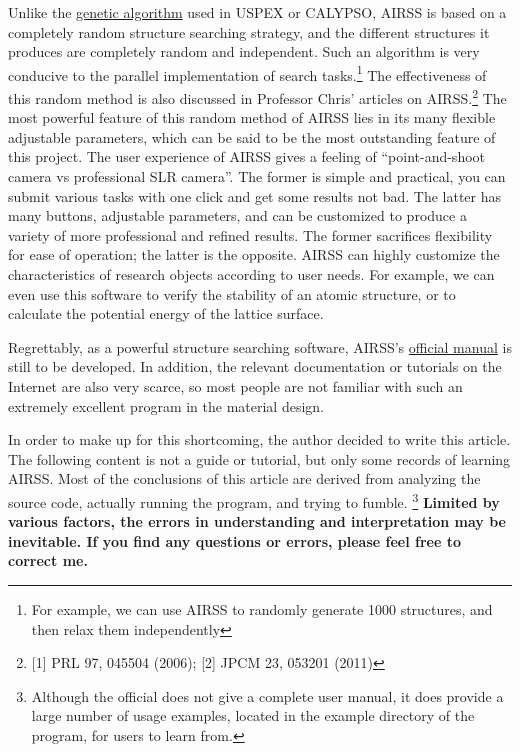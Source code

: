 \documentclass[a4paper, 10pt]{article}
\begin{document}
Unlike the \href{https://en.wikipedia.org/wiki/Genetic_algorithm}{genetic algorithm} used in USPEX or CALYPSO, AIRSS is based on a completely random structure searching strategy, and the different structures it produces are completely random and independent. Such an algorithm is very conducive to the parallel implementation of search tasks.\footnote{For example, we can use AIRSS to randomly generate 1000 structures, and then relax them independently} The effectiveness of this random method is also discussed in Professor Chris' articles on AIRSS.\footnote{ [1] PRL 97, 045504 (2006); [2] JPCM 23, 053201 (2011)} The most powerful feature of this random method of AIRSS lies in its many flexible adjustable parameters, which can be said to be the most outstanding feature of this project. The user experience of AIRSS gives a feeling of ``point-and-shoot camera vs professional SLR camera''. The former is simple and practical, you can submit various tasks with one click and get some results not bad. The latter has many buttons, adjustable parameters, and can be customized to produce a variety of more professional and refined results. The former sacrifices flexibility for ease of operation; the latter is the opposite. AIRSS can highly customize the characteristics of research objects according to user needs. For example, we can even use this software to verify the stability of an atomic structure, or to calculate the potential energy of the lattice surface.

Regrettably, as a powerful structure searching software, AIRSS's \href{https://airss-docs.github.io/technical-reference/buildcell-manual/}{official manual} is still to be developed. In addition, the relevant documentation or tutorials on the Internet are also very scarce, so most people are not familiar with such an extremely excellent program in the material design.


In order to make up for this shortcoming, the author decided to write this article. The following content is not a guide or tutorial, but only some records of learning AIRSS. Most of the conclusions of this article are derived from analyzing the source code, actually running the program, and trying to fumble. \footnote{Although the official does not give a complete user manual, it does provide a large number of usage examples, located in the example directory of the program, for users to learn from.} \textbf{Limited by various factors, the errors in understanding and interpretation may be inevitable. If you find any questions or errors, please feel free to correct me.}
\end{document}
